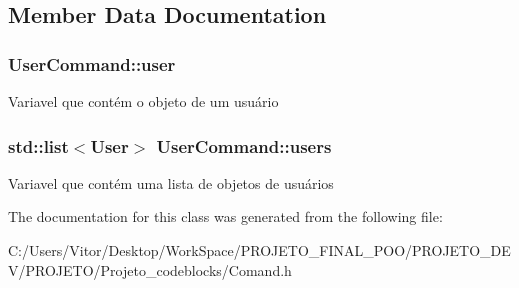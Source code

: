 \subsection{Member Data Documentation}
\hypertarget{class_user_command_a70c92f418986d19c46252d6cf5b77704}{
\subsubsection[{user}]{ User\-Command\-::user\hspace{0.3cm}{\ttfamily [protected]}}}\label{class_user_command_a70c92f418986d19c46252d6cf5b77704}
Variavel que contém o objeto de um usuário \hypertarget{class_user_command_ab0d1d3e37f63ce84d46ac7540236765f}{
\subsubsection[{users}]{\setlength{\rightskip}{0pt plus 5cm}std\-::list$<${\bf User}$>$ User\-Command\-::users\hspace{0.3cm}{\ttfamily [protected]}}}\label{class_user_command_ab0d1d3e37f63ce84d46ac7540236765f}
Variavel que contém uma lista de objetos de usuários 

The documentation for this class was generated from the following file\-:\begin{DoxyCompactItemize}
\item 
C\-:/\-Users/\-Vitor/\-Desktop/\-Work\-Space/\-P\-R\-O\-J\-E\-T\-O\-\_\-\-F\-I\-N\-A\-L\-\_\-\-P\-O\-O/\-P\-R\-O\-J\-E\-T\-O\-\_\-\-D\-E\-V/\-P\-R\-O\-J\-E\-T\-O/\-Projeto\-\_\-codeblocks/Comand.\-h\end{DoxyCompactItemize}
